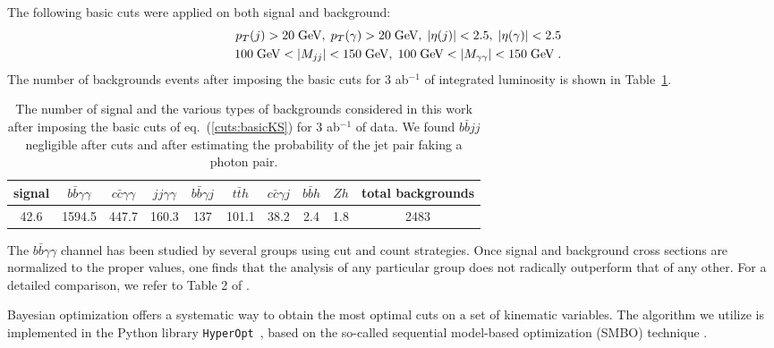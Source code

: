 The following basic cuts were applied on both signal and background:
%
\begin{eqnarray}
& & p_T(j) > 20\;\hbox{GeV},\; p_T(\gamma) > 20\;\hbox{GeV},\; |\eta(j)|<2.5,\; |\eta(\gamma)|<2.5 \nonumber \\
& & 100\;\hbox{GeV} < |M_{jj}| < 150\;\hbox{GeV},\; 100\;\hbox{GeV} < |M_{\gamma\gamma}| < 150\;\hbox{GeV}\; .
\label{cuts:basicKS} 
\end{eqnarray}
%
The number of backgrounds events after imposing the basic cuts for 3 ab$^{-1}$ of integrated luminosity is shown in Table~\ref{table:nevKS}.
%
\begin{table}[!h]
\centering
\begin{tabular}{c|c|c|c|c|c|c|c|c|c}
\hline\hline
signal & $b\bar{b}\gamma\gamma$ & $c\bar{c}\gamma\gamma$ & $jj\gamma\gamma$ & $b\bar{b}\gamma j$ & $t\bar{t}h$ & $c\bar{c}\gamma j$ &  $b\bar{b} h$ & $Zh$ & total backgrounds \\ 
\hline
42.6   & 1594.5  & 447.7   &  160.3 &   137 & 101.1  & 38.2  &  2.4    & 1.8 & 2483 \\
\hline\hline
\end{tabular}
\caption{The number of signal and the various types of backgrounds considered in this work after imposing the basic cuts of eq.~(\ref{cuts:basicKS}) for 3 ab$^{-1}$ of data. We found $b\bar{b} jj$ negligible after cuts and after estimating the probability of the jet pair faking a photon pair.}
\label{table:nevKS}
\end{table}


The $b\bar{b}\gamma\gamma$ channel has been studied by several groups using cut and count strategies. Once signal and background cross sections are normalized to the proper values, one finds that the analysis of any particular group does not radically outperform that of any other. For a detailed comparison, we refer to Table 2 of \cite{Alves:2017ued}. 

Bayesian optimization  offers a systematic way to obtain the most optimal cuts on a set of kinematic variables. The algorithm we utilize is implemented in the Python library \texttt{HyperOpt}~, based on the so-called sequential model-based optimization (SMBO) technique \cite{Bergstra1, Bergstra2, url:hyperopt}. 

